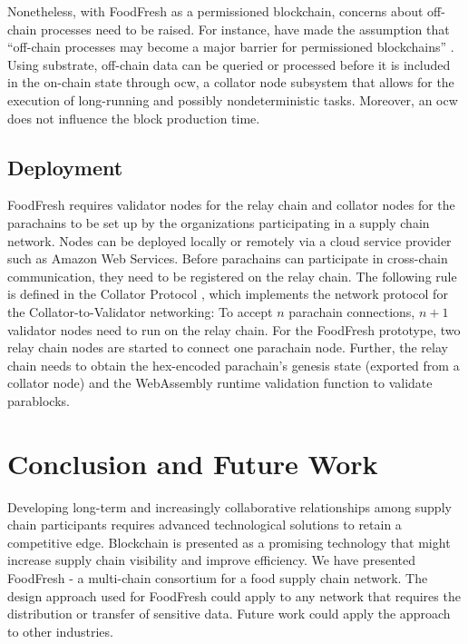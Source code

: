 \documentclass[conference]{IEEEtran}
\begin{document}
Nonetheless, with FoodFresh as a permissioned blockchain, concerns about off-chain processes need to be raised. For instance, \citeauthor{HELLIAR2020102136} have made the assumption that ``off-chain processes may become a major barrier for permissioned blockchains'' \cite{HELLIAR2020102136}. Using substrate, off-chain data can be queried or processed before it is included in the on-chain state through \ac{ocw}, a collator node subsystem that allows for the execution of long-running and possibly nondeterministic tasks. Moreover, an \ac{ocw} does not influence the block production time.

\subsection{Deployment} \label{s:deployment}
FoodFresh requires validator nodes for  the relay chain and collator nodes for the parachains to be set up by the organizations participating in a supply chain network. Nodes can be deployed locally or remotely via a cloud service provider such as Amazon Web Services. 
Before parachains can participate in cross-chain communication, they need to be registered on the relay chain. The following rule is defined in the Collator Protocol \cite{collatorProtocol}, which implements the network protocol for the Collator-to-Validator networking: To accept $n$ parachain connections, $n + 1$ validator nodes need to run on the relay chain. For the FoodFresh prototype, two relay chain nodes are started to connect one parachain node. Further, the relay chain needs to obtain the hex-encoded parachain's genesis state (exported from a collator node) and the WebAssembly runtime validation function to validate parablocks.

\section{Conclusion and Future Work} \label{s:conclusion}
Developing long-term and increasingly collaborative relationships among supply chain participants requires advanced technological solutions to retain a competitive edge. Blockchain is presented as a promising technology that might increase supply chain visibility and improve efficiency.  We have presented FoodFresh - a multi-chain consortium for a food supply chain network. The design approach used for FoodFresh
could apply to any network that requires the distribution or transfer of sensitive data.
Future work could apply the approach to other industries. 

\renewcommand*{\UrlFont}{\rmfamily}
\printbibliography
\vspace{12pt}
\end{document}
